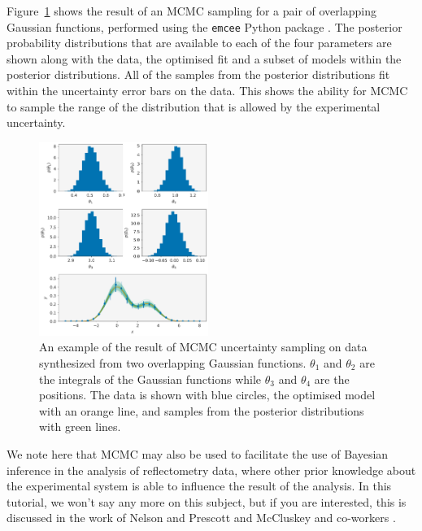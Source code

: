 \documentclass[
 reprint,
 superscriptaddress,
 amsmath,amssymb,
 aps,
]{revtex4-2}
\begin{document}
Figure~\ref{fig:mcmc} shows the result of an MCMC sampling for a pair of overlapping Gaussian functions, performed using the \texttt{emcee} Python package \cite{foremanmackey_emcee_2012}.
The posterior probability distributions that are available to each of the four parameters are shown along with the data, the optimised fit and a subset of models within the posterior distributions. 
All of the samples from the posterior distributions fit within the uncertainty error bars on the data.
This shows the ability for MCMC to sample the range of the distribution that is allowed by the experimental uncertainty. 
%
\begin{figure}[t]
    \includegraphics[width=0.49\textwidth]{mcmc}
    \caption{An example of the result of MCMC uncertainty sampling on data synthesized from two overlapping Gaussian functions. $\theta_1$ and $\theta_2$ are the integrals of the Gaussian functions while $\theta_3$ and $\theta_4$ are the positions. The data is shown with blue circles, the optimised model with an orange line, and samples from the posterior distributions with green lines.}
    \label{fig:mcmc}
\end{figure}
%

We note here that MCMC may also be used to facilitate the use of Bayesian inference in the analysis of reflectometry data, where other prior knowledge about the experimental system is able to influence the result of the analysis. 
In this tutorial, we won't say any more on this subject, but if you are interested, this is discussed in the work of Nelson and Prescott \cite{nelson_refnx_2019} and McCluskey and co-workers \cite{mccluskey_general_2020}. 
\end{document}
